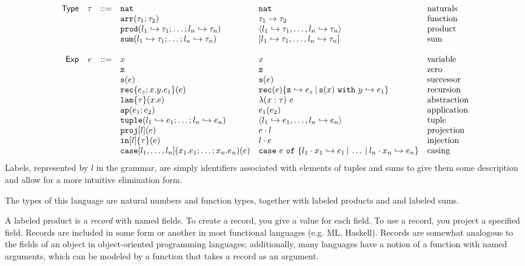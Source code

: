 \documentclass[11pt]{article}
\newcommand{\ms}[1]{\ensuremath{\mathsf{#1}}}
\newcommand{\irl}[1]{\mathtt{#1}}
\newcommand{\lam}{\irl{lam}}
\newcommand{\parr}[2]{#1 \to #2}
\newcommand{\pair}[2]{\langle #1, #2 \rangle}
\newcommand{\goesto}{\hookrightarrow}
\newcommand{\hra}{\hookrightarrow}
\newcommand{\zero}{\irl{z}}
\newcommand{\suc}[1]{\irl{s}(#1)}
\newcommand{\rec}[5]{\irl{rec}(#1) \{\irl{z} \goesto #2 \por \suc{#3} ~\irl{with}~#4 \goesto #5\} }
\newcommand{\fn}[3]{\lambda(#1:#2)~#3}
\newcommand{\ap}[2]{#1(#2)}
\newcommand{\lprodt}[1]{\langle #1\rangle}
\newcommand{\lsumt}[1]{[#1]}
\newcommand{\lpair}{\pair{l_1\hra e_1}{\dots,l_n\hra e_n}}
\newcommand{\lprodtn}{\lprodt{l_1\hra\tau_1,\dots,l_n\hra\tau_n}}
\newcommand{\lsumtn}{\lsumt{l_1\hra\tau_1,\dots,l_n\hra\tau_n}}
\newcommand{\proj}[2]{#1\cdot#2}
\newcommand{\inj}[3]{{#2}\cdot{#3}}
\newcommand{\case}[2]{\irl{case}~#1~\irl{ of }~\{#2\}}
\newcommand{\casen}{\case{e}{\inj{}{l_1}{x_1} \hra e_1\por \dots \por \inj{}{l_n}{x_n} \hra e_n}}
\newcommand{\por}{\hspace*{.2em}|\hspace*{.2em}}
\begin{document}
\[
\begin{array}{r c c l l l}
\ms{Type} & \tau & ::=
			&\irl{nat}                	 				& \irl{nat} 													& \text{naturals}\\
         &	&	&\irl{arr}(\tau_1;\tau_2) 				& \parr{\tau_1}{\tau_2} 										& \text{function}\\
         & 	&	&\irl{prod}(l_1\hra\tau_1;\dots;l_n\hra\tau_n)		& \lprodtn											& \text{product}\\
      	 & 	&	&\irl{sum}(l_1\hra\tau_1;\dots;l_n\hra\tau_n)		& \lsumtn											& \text{sum}\\
	 \\
\ms{Exp}
        & e   & ::= 	& x                                				& x 														& \text{variable}\\
        &	&	& \zero							& \zero													& \text{zero}\\
        &      &      	& \suc{e}                     				& \suc{e}													& \text{successor} \\
        &      &      	& \irl{rec}\{e_z;x.y.e_1\}(e)   			& \rec{e}{e_z}{x}{y}{e_1}										& \text{recursion}\\
        &      &      	& \lam\{\tau\}(x.e)           				& \fn{x}{\tau}{e}												& \text{abstraction} \\
        &      &     	& \irl{ap}(e_1;e_2) 					& \ap{e_1}{e_2} 											& \text{application}\\
        &      &	& \irl{tuple}(l_1\hra e_1;\dots;l_n\hra e_n) 	& \lpair													& \text{tuple}\\
 	&	&	& \irl{proj}[l](e)						& \proj{e}{l}												& \text{projection}\\
	&	&	& \irl{in}[l]\{\tau\}(e)					& \inj{\tau}{l}{e}												& \text{injection}\\
	&	&	& \irl{case}[l_1,\dots,l_n](x_1.e_1;\dots;x_n.e_n)(e) 	& \casen											& \text{casing}\\
\end{array}
\]
Labels, represented by $l$ in the grammar, are simply identifiers
associated with elements of tuples and sums to give them some
description and allow for a more intuitive elimination form.

The types of this language are natural numbers and function types,
together with labeled products and and labeled sums.  

A labeled product is a \emph{record} with named fields.  To create a
record, you give a value for each field.  To use a record, you project a
specified field.  Records are included in some form or another in most
functional languages (e.g. ML, Haskell).  Records are somewhat analogous
to the fields of an object in object-oriented programming languages;
additionally, many languages have a notion of a function with named
arguments, which can be modeled by a function that takes a record as an
argument.
\end{document}
